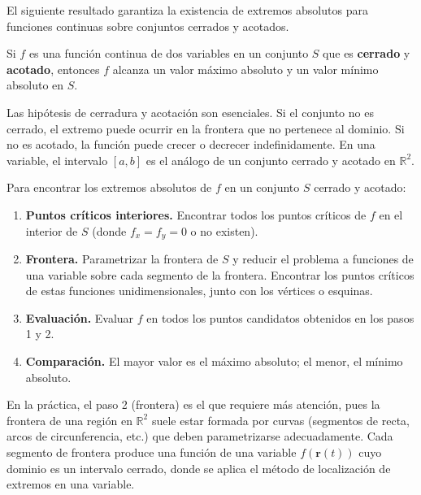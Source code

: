 El siguiente resultado garantiza la existencia de extremos absolutos para
funciones continuas sobre conjuntos cerrados y acotados.

\begin{theorem}
Si $f$ es una función continua de dos variables en un conjunto $S$ que es
\textbf{cerrado} y \textbf{acotado}, entonces $f$ alcanza un valor
máximo absoluto y un valor mínimo absoluto en $S$.
\end{theorem}

\begin{rem}
Las hipótesis de cerradura y acotación son esenciales. Si el conjunto no
es cerrado, el extremo puede ocurrir en la frontera que no pertenece al
dominio. Si no es acotado, la función puede crecer o decrecer
indefinidamente. En una variable, el intervalo $[a,b]$ es el análogo de
un conjunto cerrado y acotado en $\mathbb{R}^2$.
\end{rem}

\begin{pasos}
Para encontrar los extremos absolutos de $f$ en un conjunto $S$ cerrado y
acotado:
\begin{enumerate}
    \item \textbf{Puntos críticos interiores.} Encontrar todos los
    puntos críticos de $f$ en el interior de $S$ (donde $f_x=f_y=0$ o no
    existen).
    \item \textbf{Frontera.} Parametrizar la frontera de $S$ y reducir el
    problema a funciones de una variable sobre cada segmento de la
    frontera. Encontrar los puntos críticos de estas funciones
    unidimensionales, junto con los vértices o esquinas.
    \item \textbf{Evaluación.} Evaluar $f$ en todos los puntos candidatos
    obtenidos en los pasos 1 y 2.
    \item \textbf{Comparación.} El mayor valor es el máximo absoluto; el
    menor, el mínimo absoluto.
\end{enumerate}
\end{pasos}

\begin{rem}
En la práctica, el paso 2 (frontera) es el que requiere más atención,
pues la frontera de una región en $\mathbb{R}^2$ suele estar formada por
curvas (segmentos de recta, arcos de circunferencia, etc.) que deben
parametrizarse adecuadamente. Cada segmento de frontera produce una
función de una variable $f(\mathbf{r}(t))$ cuyo dominio es un intervalo
cerrado, donde se aplica el método de localización de extremos en una
variable.
\end{rem}

